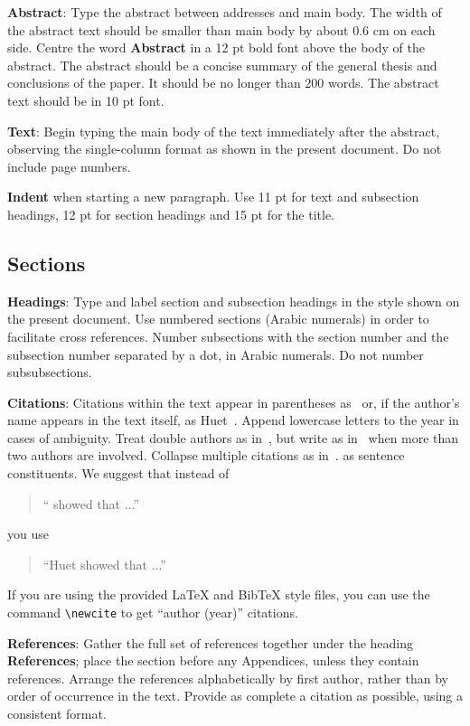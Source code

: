 \documentclass[11pt]{article}
\begin{document}
{\bf Abstract}: Type the abstract between addresses and main body.
The width of the abstract text should be
smaller than main body by about 0.6 cm on each side.
Centre the word {\bf Abstract} in a 12 pt bold
font above the body of the abstract. The abstract should be a concise
summary of the general thesis and conclusions of the paper. It should
be no longer than 200 words. The abstract text should be in 10 pt font.

{\bf Text}: Begin typing the main body of the text immediately after
the abstract, observing the single-column format as shown in 
the present document. Do not include page numbers.

{\bf Indent} when starting a new paragraph. Use 11 pt for text and 
subsection headings, 12 pt for section headings and 15 pt for
the title. 

\subsection{Sections}

{\bf Headings}: Type and label section and subsection headings in the
style shown on the present document.  Use numbered sections (Arabic
numerals) in order to facilitate cross references. Number subsections
with the section number and the subsection number separated by a dot,
in Arabic numerals. Do not number subsubsections.

{\bf Citations}: Citations within the text appear in parentheses
as~\cite{zen2} or, if the author's name appears in the text
itself, as Huet~.  Append lowercase letters
to the year in cases of ambiguity.  Treat double authors as
in~\cite{scharf-hyman09}, but write as in~\cite{platform12} when more than two
authors are involved. Collapse multiple citations as
in~\cite{zen2,platform12}. 
as sentence constituents. We suggest that instead of
\begin{quote}
  ``\cite{zen2} showed that ...''
\end{quote}
you use
\begin{quote}
``Huet    showed that ...''
\end{quote}

If you are using the provided \LaTeX{} and Bib\TeX{} style files, you
can use the command \verb|\newcite| to get ``author (year)'' citations.

\textbf{References}: Gather the full set of references together under
the heading {\bf References}; place the section before any Appendices,
unless they contain references. Arrange the references alphabetically
by first author, rather than by order of occurrence in the text.
Provide as complete a citation as possible, using a consistent format.
\end{document}

